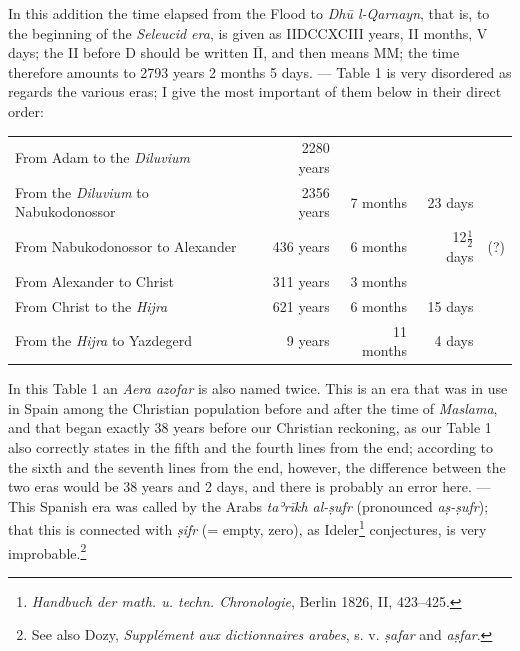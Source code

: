 \documentclass[11pt]{article}
\newcommand{\Pg}[1]{\marginpar{\footnotesize\color{gray}#1}}
\begin{document}
\par In this addition the time elapsed from the Flood to \emph{Dhū l-Qarnayn}, that is, to the beginning of the \emph{Seleucid era}, is given as IIDCCXCIII years, II months, V days; the II before D should be written $\overline{\text{II}}$, and then means MM; the time therefore amounts to 2793 years 2 months 5 days. — Table 1 is very disordered as regards the various eras; I give the most important of them below in their direct order:\par
\begin{center}\small\begin{tabular}{lrrrl}
From Adam to the \emph{Diluvium} & 2280 years &  &  &  \\
From the \emph{Diluvium} to Nabukodonossor\footnotemark{} & 2356 years & 7 months & 23 days &  \\
From Nabukodonossor to Alexander & 436 years & 6 months & 12$\tfrac{1}{2}$ days & (?) \\
From Alexander to Christ & 311 years & 3 months &  &  \\
From Christ to the \emph{Hijra} & 621 years & 6 months & 15 days &  \\
From the \emph{Hijra} to Yazdegerd & 9 years & 11 months & 4 days &  \\
\end{tabular}\end{center}
\addtocounter{footnote}{-1}
\par \Pg{36}In this Table 1 an \emph{Aera azofar} is also named twice. This is an era that was in use in Spain among the Christian population before and after the time of \emph{Maslama}, and that began exactly 38 years before our Christian reckoning, as our Table 1 also correctly states in the fifth and the fourth lines from the end; according to the sixth and the seventh lines from the end, however, the difference between the two eras would be 38 years and 2 days, and there is probably an error here. — This Spanish era was called by the Arabs \emph{taʾrīkh al-ṣufr} (pronounced \emph{aṣ-ṣufr}); that this is connected with \emph{ṣifr} (= empty, zero), as Ideler\footnote{\emph{Handbuch der math. u. techn. Chronologie}, Berlin 1826, II, 423–425.} conjectures, is very improbable.\footnote{See also Dozy, \emph{Supplément aux dictionnaires arabes}, s. v. \emph{ṣafar} and \emph{aṣfar}.}\par
\end{document}
